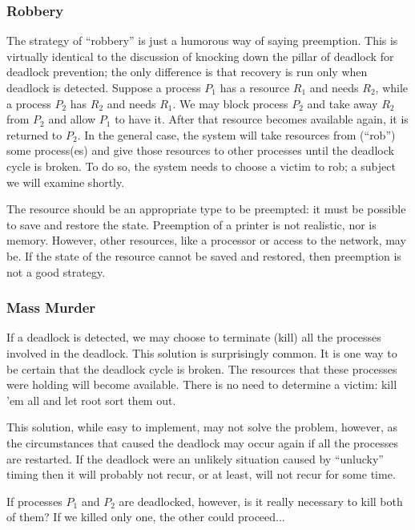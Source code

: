 \subsubsection*{Robbery}
The strategy of ``robbery'' is just a humorous way of saying preemption. This is virtually identical to the discussion of knocking down the pillar of deadlock for deadlock prevention; the only difference is that recovery is run only when deadlock is detected. Suppose a process $P_{1}$ has a resource $R_{1}$ and needs $R_{2}$, while a process $P_{2}$ has $R_{2}$ and needs $R_{1}$. We may block process $P_{2}$ and take away $R_{2}$ from $P_{2}$ and allow $P_{1}$ to have it. After that resource becomes available again, it is returned to $P_{2}$. In the general case, the system will take resources from (``rob'') some process(es) and give those resources to other processes until the deadlock cycle is broken. To do so, the system needs to choose a victim to rob; a subject we will examine shortly.

The resource should be an appropriate type to be preempted: it must be possible to save and restore the state. Preemption of a printer is not realistic, nor is memory. However, other resources, like a processor or access to the network, may be. If the state of the resource cannot be saved and restored, then preemption is not a good strategy.


\subsubsection*{Mass Murder}
If a deadlock is detected, we may choose to terminate (kill) all the processes involved in the deadlock. This solution is surprisingly common. It is one way to be certain that the deadlock cycle is broken. The resources that these processes were holding will become available. There is no need to determine a victim: kill 'em all and let root sort them out.

This solution, while easy to implement, may not solve the problem, however, as the circumstances that caused the deadlock may occur again if all the processes are restarted. If the deadlock were an unlikely situation caused by ``unlucky'' timing then it will probably not recur, or at least, will not recur for some time.

If processes $P_{1}$ and $P_{2}$ are deadlocked, however, is it really necessary to kill both of them? If we killed only one, the other could proceed...

